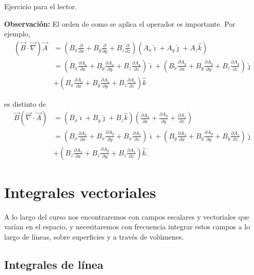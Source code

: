 \begin{demo}
Ejercicio para el lector.
\end{demo}

\textbf{Observación:} El orden de como se aplica el operador es importante. Por ejemplo,
\begin{align*}
    (\Vec{B} \cdot \Vec{\nabla}) \Vec{A} &= \left( B_x \frac{\partial}{\partial x} + B_y \frac{\partial}{\partial y} + B_z \frac{\partial}{\partial z}\right) \left( A_x \hat{\imath} + A_y \hat{\jmath} + A_z \hat{k}\right) \\
    &= \left(B_x \frac{\partial A_x}{\partial x} + B_y \frac{\partial A_x}{\partial y}  + B_z\frac{\partial A_x}{\partial z} \right) \hat{\imath} + \left(B_x \frac{\partial A_y}{\partial x} + B_y \frac{\partial A_y}{\partial y}  + B_z\frac{\partial A_y}{\partial z} \right) \hat{\jmath} \\
    & + \left(B_x \frac{\partial A_z}{\partial x} + B_y \frac{\partial A_z}{\partial y}  + B_z\frac{\partial A_z}{\partial z} \right) \hat{k}
\end{align*}

es distinto de
\begin{align*}
    \Vec{B} ( \Vec{\nabla} \cdot \Vec{A}) &= \left( B_x \hat{\imath} + B_y \hat{\jmath} + B_z \hat{k}\right) \left( \frac{\partial A_x}{\partial x} + \frac{\partial A_y}{\partial y} + \frac{\partial A_z}{\partial z}\right)  \\
    &= \left(B_x \frac{\partial A_x}{\partial x} + B_x \frac{\partial A_y}{\partial y}  + B_x\frac{\partial A_z}{\partial z} \right) \hat{\imath} + \left(B_y \frac{\partial A_x}{\partial x} + B_y \frac{\partial A_y}{\partial y}  + B_y \frac{\partial A_z}{\partial z} \right) \hat{\jmath} \\
    & + \left(B_z \frac{\partial A_x}{\partial x} + B_z \frac{\partial A_y}{\partial y}  + B_z\frac{\partial A_z}{\partial z} \right) \hat{k}.
\end{align*}

\section{Integrales vectoriales}

A lo largo del curso nos encontraremos con campos escalares y vectoriales que varían en el espacio, y necesitaremos con frecuencia integrar estos campos a lo largo de líneas, sobre superficies y a través de volúmenes.

\subsection{Integrales de línea}

